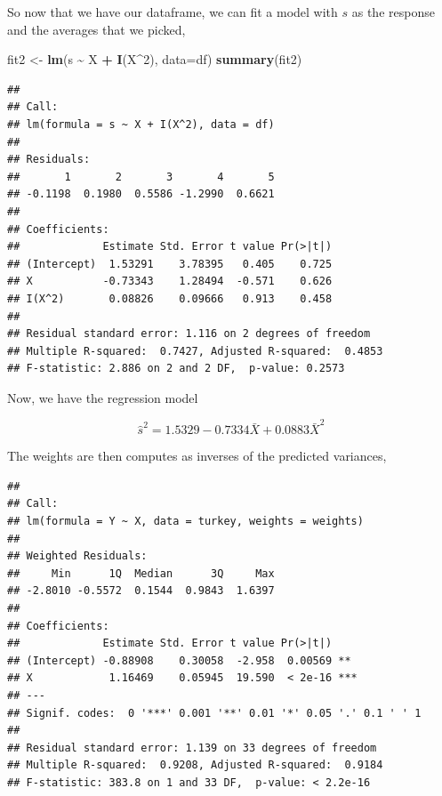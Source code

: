 \documentclass[
  11pt,
]{article}
\newenvironment{Shaded}{\begin{snugshade}}{\end{snugshade}}
\newcommand{\AttributeTok}[1]{\textcolor[rgb]{0.13,0.29,0.53}{#1}}
\newcommand{\DecValTok}[1]{\textcolor[rgb]{0.00,0.00,0.81}{#1}}
\newcommand{\FunctionTok}[1]{\textcolor[rgb]{0.13,0.29,0.53}{\textbf{#1}}}
\newcommand{\NormalTok}[1]{#1}
\newcommand{\OtherTok}[1]{\textcolor[rgb]{0.56,0.35,0.01}{#1}}
\newcommand{\SpecialCharTok}[1]{\textcolor[rgb]{0.81,0.36,0.00}{\textbf{#1}}}
\begin{document}
So now that we have our dataframe, we can fit a model with \(s\) as the
response and the averages that we picked,

\begin{Shaded}
\begin{Highlighting}[]
\NormalTok{fit2 }\OtherTok{\textless{}{-}} \FunctionTok{lm}\NormalTok{(s }\SpecialCharTok{\textasciitilde{}}\NormalTok{ X }\SpecialCharTok{+} \FunctionTok{I}\NormalTok{(X}\SpecialCharTok{\^{}}\DecValTok{2}\NormalTok{), }\AttributeTok{data=}\NormalTok{df)}
\FunctionTok{summary}\NormalTok{(fit2)}
\end{Highlighting}
\end{Shaded}

\begin{verbatim}
## 
## Call:
## lm(formula = s ~ X + I(X^2), data = df)
## 
## Residuals:
##       1       2       3       4       5 
## -0.1198  0.1980  0.5586 -1.2990  0.6621 
## 
## Coefficients:
##             Estimate Std. Error t value Pr(>|t|)
## (Intercept)  1.53291    3.78395   0.405    0.725
## X           -0.73343    1.28494  -0.571    0.626
## I(X^2)       0.08826    0.09666   0.913    0.458
## 
## Residual standard error: 1.116 on 2 degrees of freedom
## Multiple R-squared:  0.7427, Adjusted R-squared:  0.4853 
## F-statistic: 2.886 on 2 and 2 DF,  p-value: 0.2573
\end{verbatim}

Now, we have the regression model

\[\hat{s}^2 = 1.5329 - 0.7334\bar{X} + 0.0883\bar{X}^2\]

The weights are then computes as inverses of the predicted variances,

\begin{Shaded}
\end{Shaded}

\begin{verbatim}
## 
## Call:
## lm(formula = Y ~ X, data = turkey, weights = weights)
## 
## Weighted Residuals:
##     Min      1Q  Median      3Q     Max 
## -2.8010 -0.5572  0.1544  0.9843  1.6397 
## 
## Coefficients:
##             Estimate Std. Error t value Pr(>|t|)    
## (Intercept) -0.88908    0.30058  -2.958  0.00569 ** 
## X            1.16469    0.05945  19.590  < 2e-16 ***
## ---
## Signif. codes:  0 '***' 0.001 '**' 0.01 '*' 0.05 '.' 0.1 ' ' 1
## 
## Residual standard error: 1.139 on 33 degrees of freedom
## Multiple R-squared:  0.9208, Adjusted R-squared:  0.9184 
## F-statistic: 383.8 on 1 and 33 DF,  p-value: < 2.2e-16
\end{verbatim}
\end{document}
